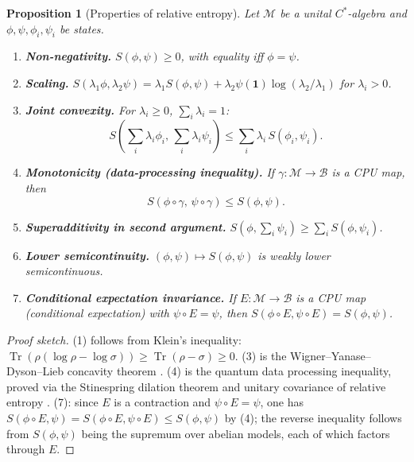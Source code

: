 \documentclass[12pt,a4paper]{article}
\newtheorem{proposition}[theorem]{Proposition}
\newcommand{\Tr}{\operatorname{Tr}}
\newcommand{\id}{\mathbf{1}}  %
\newcommand{\vN}{\mathcal{M}}      %
\newcommand{\Srel}{S}              %
\begin{document}
\begin{proposition}[Properties of relative entropy]\label{prop:rel_ent_props}
Let $\vN$ be a unital $C^*$-algebra and $\phi,\psi,\phi_i,\psi_i$ be states.
\begin{enumerate}
\item[(1)] \textbf{Non-negativity.} $\Srel(\phi,\psi)\ge 0$, with equality iff $\phi=\psi$.
\item[(2)] \textbf{Scaling.} $\Srel(\lambda_1\phi,\lambda_2\psi) = \lambda_1\Srel(\phi,\psi) + \lambda_2\psi(\id)\log(\lambda_2/\lambda_1)$ for $\lambda_i>0$.
\item[(3)] \textbf{Joint convexity.} For $\lambda_i\ge 0$, $\sum_i\lambda_i=1$:
  \begin{equation}\label{eq:rel_ent_joint_convex}
    \Srel\!\left(\sum_i\lambda_i\phi_i,\,\sum_i\lambda_i\psi_i\right)
    \le \sum_i \lambda_i\,\Srel(\phi_i,\psi_i).
  \end{equation}
\item[(4)] \textbf{Monotonicity (data-processing inequality).}
  If $\gamma:\vN\to\mathcal{B}$ is a CPU map, then
  \begin{equation}\label{eq:data_processing}
    \Srel(\phi\circ\gamma,\,\psi\circ\gamma) \le \Srel(\phi,\psi).
  \end{equation}
\item[(5)] \textbf{Superadditivity in second argument.}
  $\Srel\!\left(\phi,\sum_i\psi_i\right)\ge\sum_i\Srel(\phi,\psi_i)$.
\item[(6)] \textbf{Lower semicontinuity.}
  $(\phi,\psi)\mapsto\Srel(\phi,\psi)$ is weakly lower semicontinuous.
\item[(7)] \textbf{Conditional expectation invariance.}
  If $E:\vN\to\mathcal{B}$ is a CPU map (conditional expectation) with
  $\psi\circ E = \psi$, then $\Srel(\phi\circ E,\psi\circ E)=\Srel(\phi,\psi)$.
\end{enumerate}
\end{proposition}

\begin{proof}[Proof sketch]
(1) follows from Klein's inequality: $\Tr(\rho(\log\rho-\log\sigma))\ge\Tr(\rho-\sigma)\ge 0$.
(3) is the Wigner--Yanase--Dyson--Lieb concavity theorem \cite{lieb73}.
(4) is the quantum data processing inequality, proved via the Stinespring dilation theorem
and unitary covariance of relative entropy \cite{lindblad75}.
(7): since $E$ is a contraction and $\psi\circ E=\psi$, one has
$\Srel(\phi\circ E,\psi)=\Srel(\phi\circ E,\psi\circ E)\le\Srel(\phi,\psi)$
by (4); the reverse inequality follows from $\Srel(\phi,\psi)$ being the supremum
over abelian models, each of which factors through $E$.
\end{proof}
\end{document}
